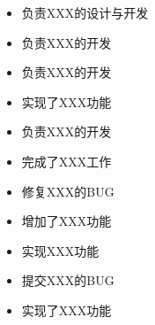 \documentclass[10pt,a4paper]{xresume}
\begin{document}
\begin{minipage}[t]{0.66\textwidth}


  \begin{itemize}
  \item 负责XXX的设计与开发
  \item 负责XXX的开发
  \end{itemize}
  
  \divider{}

  \begin{itemize}
  \item 负责XXX的开发
  \item 实现了XXX功能
  \end{itemize}

  \divider{}

  \begin{itemize}
  \item 负责XXX的开发
  \item 完成了XXX工作
  \end{itemize}

  \begin{itemize}
  \item 修复XXX的BUG
  \item 增加了XXX功能
  \end{itemize}

  \divider{}

  \begin{itemize}
  \item 实现XXX功能
  \item 提交XXX的BUG
  \end{itemize}

\end{minipage}

\newpage


\begin{itemize}
\item 实现了XXX功能
\end{itemize}
\end{document}
